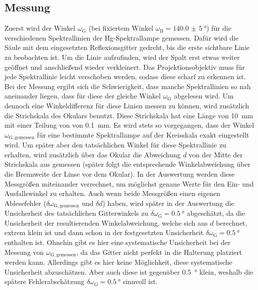 \subsection{Messung}\label{subsec:balmer_messung}
Zuerst wird der Winkel $\omega_{\mathrm{G}}$ (bei fixiertem Winkel $\omega_{\mathrm{B}} = \SI{140,0(5)}{\degree}$) für die verschiedenen Spektrallinien der
Hg-Spektrallampe gemessen. Dafür wird die Säule mit dem eingesetzten Reflexionsgitter gedreht, bis die erste sichtbare Linie zu beobachten ist. Um die Linie
aufzufinden, wird der Spalt erst etwas weiter geöffnet und anschließend wieder verkleinert. Das Projektionsobjektiv muss für jede Spektrallinie leicht verschoben werden, sodass
diese scharf zu erkennen ist. Bei der Messung ergibt sich die Schwierigkeit, dass manche Spektrallinien so nah aneinander liegen, dass für diese der gleiche Winkel
$\omega_{\mathrm{G}}$ abgelesen wird. Um dennoch eine Winkeldifferenz für diese Linien messen zu können, wird zusätzlich die Strichskala des Okulars benutzt. Diese Strichskala
hat eine Länge von \SI{10}{\milli \meter} mit einer Teilung von von \SI{0,1}{\milli \meter}. Es wird stets so vorgegangen, dass der Winkel $\omega_{\mathrm{G,gemessen}}$ für eine bestimmte
Spektrallampe auf der Kreisskala exakt eingestellt wird. Um später aber den tatsächlichen Winkel für diese Spektrallinie zu erhalten, wird zusätzlich über das Okular
die Abweichung $d$ von der Mitte der Strichskala aus gemessen (später folgt die entsprechende Winkelabweichung über die Brennweite der Linse vor dem Okular).
In der Auswertung werden diese Messgrößen miteinander verrechnet, um möglichst genaue Werte für den Ein- und Ausfallswinkel zu erhalten. Auch wenn beide Messgrößen einen
eigenen Ablesefehler ($\delta \omega_{\mathrm{G,gemessen}}$ und $\delta d$) haben, wird später in der Auswertung die Unsicherheit des tatsächlichen Gitterwinkels zu $\delta \omega_{\mathrm{G}} = \SI{0,5}{\degree}$
abgeschätzt, da die Unsicherheit der resultierenden Winkelabweichung, welche sich aus $d$ berechnet, extrem klein ist und dann schon in der festgesetzten Unsicherheit $\delta \omega_{\mathrm{G}} = \SI{0,5}{\degree}$
enthalten ist. Ohnehin gibt es hier eine systematische Unsicherheit bei der Messung von $\omega_{\mathrm{G,gemessen}}$, da das Gitter nicht perfekt in die Halterung platziert werden kann.
Allerdings gibt es hier keine Möglichkeit, diese systematische Unsicherheit abzuschätzen. Aber auch diese ist gegenüber \SI{0,5}{\degree} klein, weshalb die spätere
Fehlerabschätzung $\delta \omega_{\mathrm{G}} = \SI{0,5}{\degree}$ sinnvoll ist.
